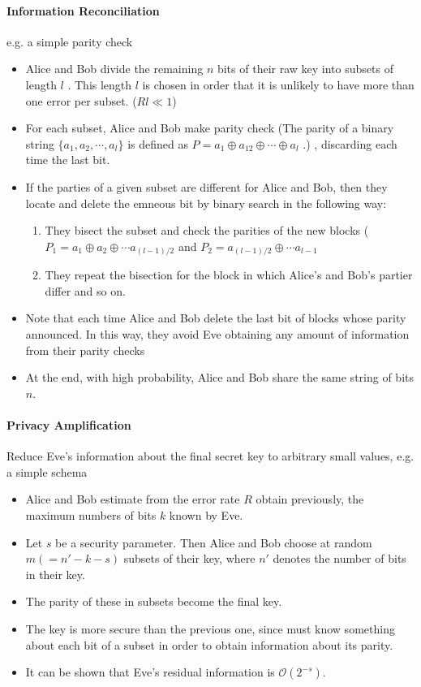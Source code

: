 \documentclass[]{book}
\theoremstyle{nonumberplain}
\begin{document}
\paragraph{Information Reconciliation} e.g. a simple parity check
\begin{itemize}
    \item Alice and Bob divide the remaining $n$ bits of their raw key into subsets of length $l$ . This length $l$ is chosen in order that it is unlikely to have more than one error per subset. ($Rl \ll 1$)
    \item For each subset, Alice and Bob make parity check (The parity of a binary string $\{a_{1}, a_{2}, \cdots ,a_{l}\}$ is defined as  $P=a_{1}\oplus a_{12}\oplus \cdots \oplus a_{l}$ .) , discarding each time the last bit. 
    \item If the parties of a given subset are different for Alice and Bob, then they locate and delete the emneous bit by binary search in the following way:
    \begin{enumerate}
        \item They bisect the subset and check the parities of the new blocks ($P_{1}=a_{1}\oplus a_{2}\oplus\cdots a_{(l-1)/2}$ and $P_{2}=a_{(l-1)/2}\oplus \cdots a_{l-1}$
        \item They repeat the bisection for the block in which Alice's and Bob's partier differ and so on.
    \end{enumerate}
    \item Note that each time Alice and Bob delete the last bit of blocks whose parity announced. In this way, they avoid Eve obtaining any amount of information from their parity checks
    \item At the end, with high probability, Alice and Bob share the same string of bits $n$.
\end{itemize}
\paragraph{Privacy Amplification}Reduce Eve's information about the final secret key to arbitrary small values, e.g. a simple schema
\begin{itemize}
    \item Alice and Bob estimate from the error rate $R$ obtain previously, the maximum numbers of bits $k$ known by Eve.
    \item Let $s$ be a security parameter. Then Alice and Bob choose at random $m(=n'-k-s)$ subsets of their key, where $n'$ denotes the number of bits in their key. 
    \item The parity of these in subsets become the final key. 
    \item The key is more secure than the previous one, since must know something about each bit of a subset in order to obtain information about its parity. 
    \item It can be shown that Eve's residual information is $\mathcal{O}(2^{-s})$.
\end{itemize}
\end{document}
